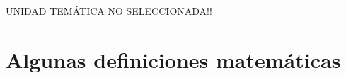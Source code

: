 \documentclass[12pt]{article}
\theoremstyle{definition}
\theoremstyle{definition}
\theoremstyle{definition}
\theoremstyle{definition}
\newcommand{\unidadtem}{0}
\begin{document}
\ifcase%
\unidadtem{} {
        
        \newpage
        
        \newpage
        
        \newpage
        
        \newpage
        
        \newpage
        
        \newpage
        
        \newpage
        
    }
    \or 
    \or 
    \or 
    \or 
    \or 
    \or 
    \or 
    \or 
    \else UNIDAD TEMÁTICA NO SELECCIONADA!!
\fi

\newpage

\appendix


\section{Algunas definiciones matemáticas}


\printbibliography
{}
\end{document}
